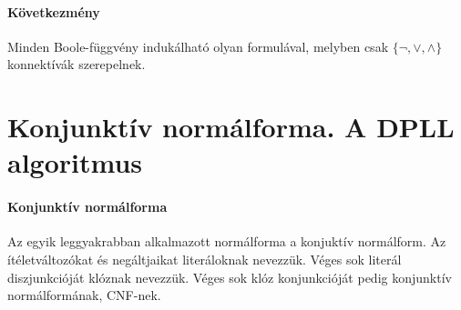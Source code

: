 \documentclass[10pt,a4paper]{article}
\begin{document}
\paragraph{Következmény} Minden Boole-függvény indukálható olyan formulával, melyben csak $\{\neg, \vee, \wedge\}$ konnektívák szerepelnek.

\newpage
\section{Konjunktív normálforma. A DPLL algoritmus}
\paragraph{Konjunktív normálforma}
Az egyik leggyakrabban alkalmazott normálforma a konjuktív normálform. Az ítéletváltozókat és negáltjaikat literáloknak nevezzük. Véges sok literál diszjunkcióját klóznak nevezzük. Véges sok klóz konjunkcióját pedig konjunktív normálformának, CNF-nek.
\end{document}
